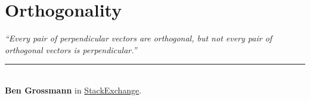 \chapter{Orthogonality}\label{chp:ortho}


\begin{flushright}
\textit{``Every pair of perpendicular vectors are orthogonal, but not every pair of orthogonal vectors is perpendicular.''}\\
\rule{0.5\textwidth}{.4pt}\\
\textbf{Ben Grossmann} \small{in \href{https://math.stackexchange.com/questions/2326896/about-perpendicular-vectors}{StackExchange}.}
\end{flushright}
